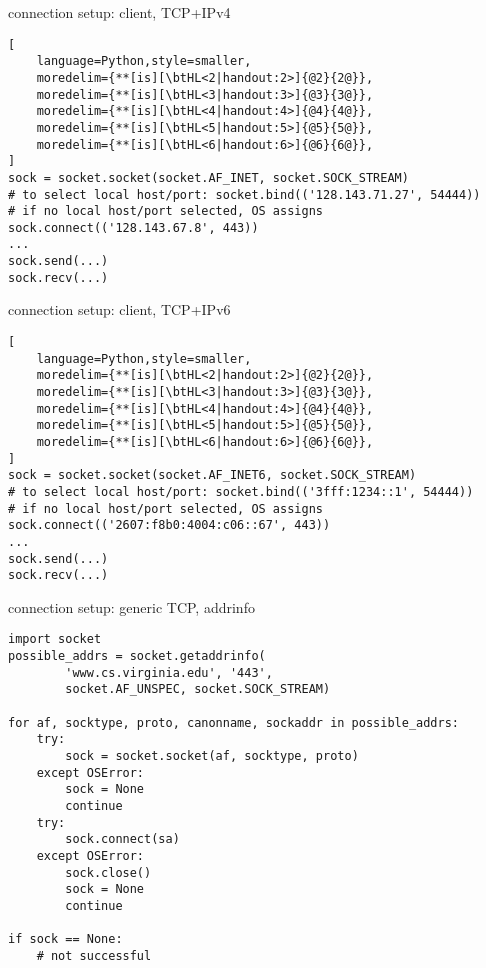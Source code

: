 \begin{frame}[fragile,label=connSetupClientAddrInfo]{connection setup: client, TCP+IPv4}
\begin{lstlisting}[
    language=Python,style=smaller,
    moredelim={**[is][\btHL<2|handout:2>]{@2}{2@}},
    moredelim={**[is][\btHL<3|handout:3>]{@3}{3@}},
    moredelim={**[is][\btHL<4|handout:4>]{@4}{4@}},
    moredelim={**[is][\btHL<5|handout:5>]{@5}{5@}},
    moredelim={**[is][\btHL<6|handout:6>]{@6}{6@}},
]
sock = socket.socket(socket.AF_INET, socket.SOCK_STREAM)
# to select local host/port: socket.bind(('128.143.71.27', 54444))
# if no local host/port selected, OS assigns
sock.connect(('128.143.67.8', 443))
...
sock.send(...)
sock.recv(...)
\end{lstlisting}
\end{frame}

\begin{frame}[fragile,label=connSetupClientAddrInfo]{connection setup: client, TCP+IPv6}
\begin{lstlisting}[
    language=Python,style=smaller,
    moredelim={**[is][\btHL<2|handout:2>]{@2}{2@}},
    moredelim={**[is][\btHL<3|handout:3>]{@3}{3@}},
    moredelim={**[is][\btHL<4|handout:4>]{@4}{4@}},
    moredelim={**[is][\btHL<5|handout:5>]{@5}{5@}},
    moredelim={**[is][\btHL<6|handout:6>]{@6}{6@}},
]
sock = socket.socket(socket.AF_INET6, socket.SOCK_STREAM)
# to select local host/port: socket.bind(('3fff:1234::1', 54444))
# if no local host/port selected, OS assigns
sock.connect(('2607:f8b0:4004:c06::67', 443))
...
sock.send(...)
sock.recv(...)
\end{lstlisting}
\end{frame}


\begin{frame}[fragile,label=connSetupClientAddrInfo]{connection setup: generic TCP, addrinfo}
\begin{Verbatim}[fontsize=\fontsize{9}{10}]
import socket
possible_addrs = socket.getaddrinfo(
        'www.cs.virginia.edu', '443',
        socket.AF_UNSPEC, socket.SOCK_STREAM)

for af, socktype, proto, canonname, sockaddr in possible_addrs:
    try:
        sock = socket.socket(af, socktype, proto)
    except OSError:
        sock = None
        continue
    try:
        sock.connect(sa)
    except OSError:
        sock.close()
        sock = None
        continue

if sock == None:
    # not successful
\end{Verbatim}
\end{frame}

